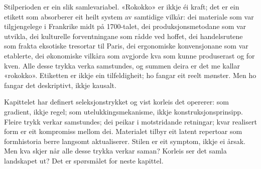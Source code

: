 Stilperioden er ein slik samlevariabel. «Rokokko» er ikkje éi kraft; det er ein etikett som absorberer eit heilt system av samtidige vilkår: dei materiale som var tilgjengelege i Frankrike midt på 1700-talet, dei produksjonsmetodane som var utvikla, dei kulturelle forventningane som rådde ved hoffet, dei handelsrutene som frakta eksotiske tresortar til Paris, dei ergonomiske konvensjonane som var etablerte, dei økonomiske vilkåra som avgjorde kva som kunne produserast og for kven. Alle desse trykka verka samstundes, og summen deira er det me kallar «rokokko». Etiketten er ikkje ein tilfeldigheit; ho fangar eit reelt mønster. Men ho fangar det deskriptivt, ikkje kausalt.



\begin{overgang}
Kapittelet har definert seleksjonstrykket og vist korleis det opererer: som gradient, ikkje regel; som utelukkingsmekanisme, ikkje konstruksjonsprinsipp. Fleire trykk verkar samstundes; dei peikar i motstridande retningar; kvar realisert form er eit kompromiss mellom dei. Materialet tilbyr eit latent repertoar som formhistoria berre langsomt aktualiserer. Stilen er eit symptom, ikkje ei årsak. Men kva skjer når alle desse trykka verkar saman? Korleis ser det samla landskapet ut? Det er spørsmålet for neste kapittel.
\end{overgang}
